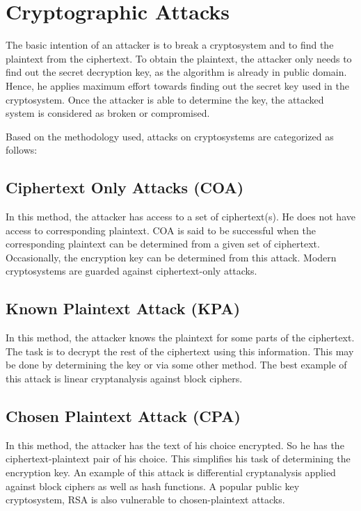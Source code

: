 \documentclass[british]{report}
\begin{document}
\section{Cryptographic Attacks}

The basic intention of an attacker is to break a cryptosystem and
to find the plaintext from the ciphertext. To obtain the plaintext,
the attacker only needs to find out the secret decryption key, as
the algorithm is already in public domain. Hence, he applies maximum
effort towards finding out the secret key used in the cryptosystem.
Once the attacker is able to determine the key, the attacked system
is considered as broken or compromised.

Based on the methodology used, attacks on cryptosystems are categorized
as follows:

\subsection{Ciphertext Only Attacks (COA) }

In this method, the attacker has access to a set of ciphertext(s).
He does not have access to corresponding plaintext. COA is said to
be successful when the corresponding plaintext can be determined from
a given set of ciphertext. Occasionally, the encryption key can be
determined from this attack. Modern cryptosystems are guarded against
ciphertext-only attacks.

\subsection{Known Plaintext Attack (KPA)}

In this method, the attacker knows the plaintext for some parts of
the ciphertext. The task is to decrypt the rest of the ciphertext
using this information. This may be done by determining the key or
via some other method. The best example of this attack is linear cryptanalysis
against block ciphers.

\subsection{Chosen Plaintext Attack (CPA)}

In this method, the attacker has the text of his choice encrypted.
So he has the ciphertext-plaintext pair of his choice. This simplifies
his task of determining the encryption key. An example of this attack
is differential cryptanalysis applied against block ciphers as well
as hash functions. A popular public key cryptosystem, RSA is also
vulnerable to chosen-plaintext attacks.
\end{document}
